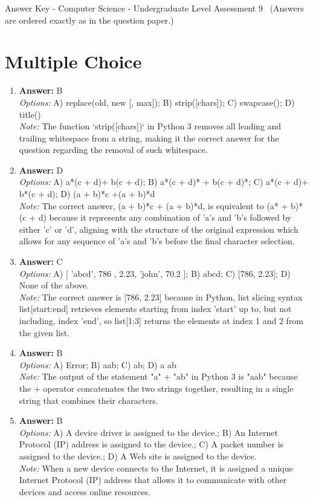 \documentclass[12pt]{article}
\begin{document}
\begin{center}
Answer Key - Computer Science - Undergraduate Level Assessment 9 \
\small (Answers are ordered exactly as in the question paper.)
\end{center}

\section*{Multiple Choice}
\begin{enumerate}[label=\arabic*.]
\item \textbf{Answer:} B
\\ \textit{Options:} A) replace(old, new [, max]); B) strip([chars]); C) swapcase(); D) title()
\\ \textit{Note:} The function `strip([chars])` in Python 3 removes all leading and trailing whitespace from a string, making it the correct answer for the question regarding the removal of such whitespace.
\item \textbf{Answer:} D
\\ \textit{Options:} A) a*(c + d)+ b(c + d); B) a*(c + d)* + b(c + d)*; C) a*(c + d)+ b*(c + d); D) (a + b)*c +(a + b)*d
\\ \textit{Note:} The correct answer, (a + b)*c + (a + b)*d, is equivalent to (a* + b)*(c + d) because it represents any combination of 'a's and 'b's followed by either 'c' or 'd', aligning with the structure of the original expression which allows for any sequence of 'a's and 'b's before the final character selection.
\item \textbf{Answer:} C
\\ \textit{Options:} A) [ 'abcd', 786 , 2.23, 'john', 70.2 ]; B) abcd; C) [786, 2.23]; D) None of the above.
\\ \textit{Note:} The correct answer is [786, 2.23] because in Python, list slicing syntax list[start:end] retrieves elements starting from index 'start' up to, but not including, index 'end', so list[1:3] returns the elements at index 1 and 2 from the given list.
\item \textbf{Answer:} B
\\ \textit{Options:} A) Error; B) aab; C) ab; D) a ab
\\ \textit{Note:} The output of the statement "a" + "ab" in Python 3 is "aab" because the + operator concatenates the two strings together, resulting in a single string that combines their characters.
\item \textbf{Answer:} B
\\ \textit{Options:} A) A device driver is assigned to the device.; B) An Internet Protocol (IP) address is assigned to the device.; C) A packet number is assigned to the device.; D) A Web site is assigned to the device.
\\ \textit{Note:} When a new device connects to the Internet, it is assigned a unique Internet Protocol (IP) address that allows it to communicate with other devices and access online resources.
\end{enumerate}
\end{document}
